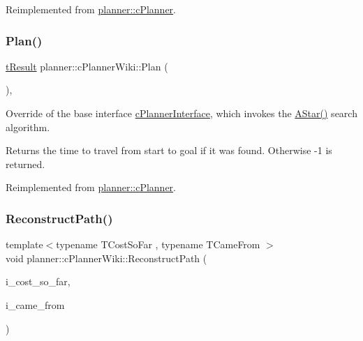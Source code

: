 Reimplemented from \mbox{\hyperlink{classplanner_1_1c_planner_a341e70531266f023ac9461d18979d1ef}{planner\+::c\+Planner}}.

\mbox{\label{classplanner_1_1c_planner_wiki_a9d18be721400b51162ff463ab11d1721}} 
\subsubsection{\texorpdfstring{Plan()}{Plan()}}
{\footnotesize\ttfamily \mbox{\hyperlink{structt_result}{t\+Result}} planner\+::c\+Planner\+Wiki\+::\+Plan (\begin{DoxyParamCaption}{ }\end{DoxyParamCaption})\hspace{0.3cm}{\ttfamily [override]}, {\ttfamily [virtual]}}



Override of the base interface \mbox{\hyperlink{classplanner_1_1c_planner_interface}{c\+Planner\+Interface}}, which invokes the \mbox{\hyperlink{classplanner_1_1c_planner_wiki_a2652cf0e84d0a1fcd17e6c4288179955}{A\+Star()}} search algorithm. 

\begin{DoxyReturn}{Returns}
the time to travel from start to goal if it was found. Otherwise -\/1 is returned. 
\end{DoxyReturn}


Reimplemented from \mbox{\hyperlink{classplanner_1_1c_planner_a21230c015260b9fc34ad2f239592470e}{planner\+::c\+Planner}}.

\mbox{\label{classplanner_1_1c_planner_wiki_a049e5c4a9540fecbe82a0648f771bbd2}} 
\subsubsection{\texorpdfstring{Reconstruct\+Path()}{ReconstructPath()}}
{\footnotesize\ttfamily template$<$typename T\+Cost\+So\+Far , typename T\+Came\+From $>$ \\
void planner\+::c\+Planner\+Wiki\+::\+Reconstruct\+Path (\begin{DoxyParamCaption}\item[{T\+Cost\+So\+Far \&\&}]{i\+\_\+cost\+\_\+so\+\_\+far,  }\item[{T\+Came\+From \&\&}]{i\+\_\+came\+\_\+from }\end{DoxyParamCaption})}



